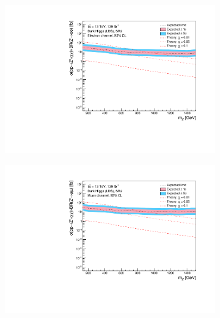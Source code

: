 \documentclass[12pt, a4paper]{book}
\begin{document}
\begin{figure}[!ht]
\begin{subfigure}[b]{0.49\textwidth}
   \end{subfigure}
   \hfill
   \begin{subfigure}[b]{0.49\textwidth}
      \centering
      \includegraphics[width=1\textwidth]{Limits/Model_independent/100-150/DH_LDS/mass_exclusion_ee.pdf}
   \end{subfigure}
   \hfill
   \begin{subfigure}[b]{0.49\textwidth}
      \centering
      \includegraphics[width=1\textwidth]{Limits/Model_independent/100-150/DH_LDS/mass_exclusion_uu.pdf}
   \end{subfigure}
   \hfill
	\begin{subfigure}[b]{0.49\textwidth}
      \centering

\end{subfigure}
\end{figure}
\end{document}
